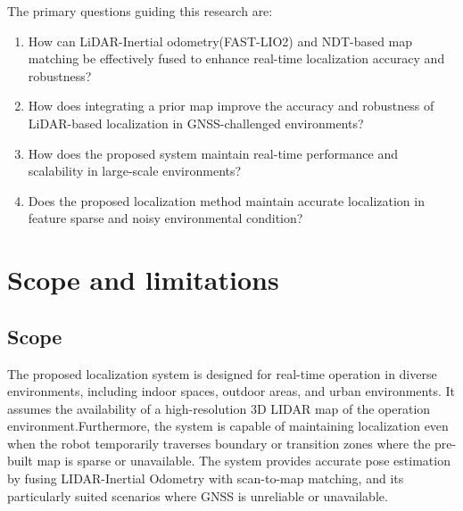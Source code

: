 The primary questions guiding this research are:
\begin{enumerate}
	\item How can LiDAR-Inertial odometry(FAST-LIO2) and NDT-based map matching be effectively fused to enhance real-time localization accuracy and robustness?
	\item How does integrating a prior map improve the accuracy and robustness of LiDAR-based localization in GNSS-challenged environments?

	\item How does the proposed system maintain real-time performance and scalability in large-scale environments?
	\item Does the proposed localization method maintain accurate localization in feature sparse and noisy environmental condition?

\end{enumerate}
\section{Scope and limitations}
\subsection{Scope}
The proposed localization system is designed for real-time operation in diverse environments, including indoor spaces, outdoor areas, and urban environments. It assumes the availability of a high-resolution 3D LIDAR map of the operation environment.Furthermore, the system is capable of maintaining localization even when the robot temporarily traverses boundary or transition zones where the pre-built map is sparse or unavailable.  The system provides accurate pose estimation by fusing LIDAR-Inertial Odometry with scan-to-map matching, and its particularly suited scenarios where GNSS is unreliable or unavailable.
